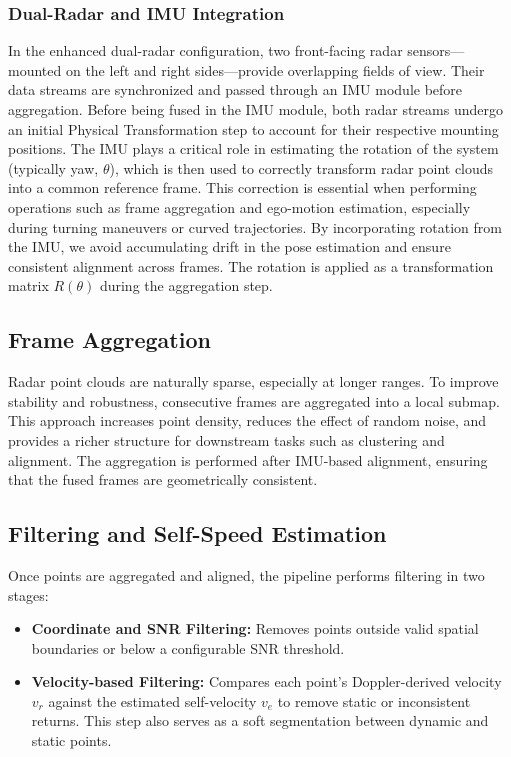 \subsubsection*{Dual-Radar and IMU Integration}
In the enhanced dual-radar configuration, two front-facing radar sensors—mounted on the left and right sides—provide overlapping fields of view. 
Their data streams are synchronized and passed through an IMU module before aggregation.
Before being fused in the IMU module, both radar streams undergo an initial Physical Transformation step to account for their respective mounting positions.
The IMU plays a critical role in estimating the rotation of the system (typically yaw, $\theta$), which is then used to correctly transform radar point clouds into a common reference frame. 
This correction is essential when performing operations such as frame aggregation and ego-motion estimation, especially during turning maneuvers or curved trajectories.
By incorporating rotation from the IMU, we avoid accumulating drift in the pose estimation and ensure consistent alignment across frames. 
The rotation is applied as a transformation matrix $R(\theta)$ during the aggregation step.

\subsection*{Frame Aggregation}
Radar point clouds are naturally sparse, especially at longer ranges. 
To improve stability and robustness, consecutive frames are aggregated into a local submap. 
This approach increases point density, reduces the effect of random noise, and provides a richer structure for downstream tasks such as clustering and alignment. 
The aggregation is performed after IMU-based alignment, ensuring that the fused frames are geometrically consistent. 

\subsection*{Filtering and Self-Speed Estimation}
Once points are aggregated and aligned, the pipeline performs filtering in two stages:

\begin{itemize}
    \item \textbf{Coordinate and SNR Filtering:} Removes points outside valid spatial boundaries or below a configurable SNR threshold.
    \item \textbf{Velocity-based Filtering:} Compares each point's Doppler-derived velocity $v_r$ against the estimated self-velocity $v_e$ to remove static or inconsistent returns. This step also serves as a soft segmentation between dynamic and static points.
\end{itemize}

